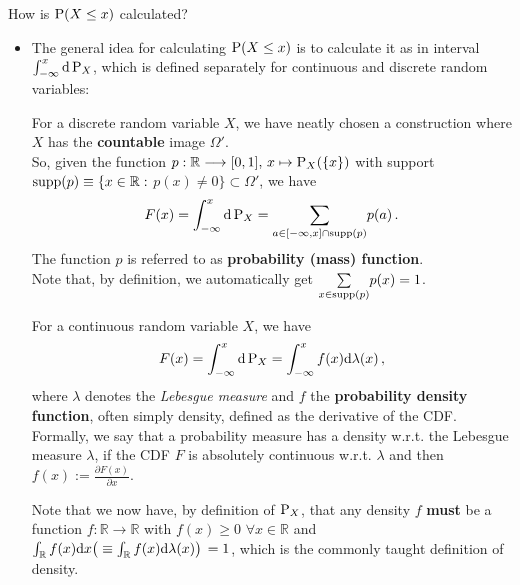 \documentclass[a4,11pt]{beamer}
\newcommand{\R}{\mathbb{R}}
\newlength{\wideitemsep}
\let\olditem\item
\renewcommand{\item}{\setlength{\itemsep}{\wideitemsep}\olditem}
\begin{document}
\begin{frame}[allowframebreaks]{How is $\operatorname{P}(X\leq x)$ calculated?}
\vspace{-.4cm}
    \begin{itemize}
        \item The general idea for calculating $\operatorname{P}(X\leq x)$ is to calculate it as in interval $\int_{-\infty}^x\mathrm{d}\operatorname{P}_X$, which is defined separately for continuous and discrete random variables:
        \begin{definition}
          For a \textcolor{blueberry}{discrete random variable} $X$, we have neatly chosen a construction where $X$ has the \textbf{countable} image $\Omega'$. \\So, given the function $p:\R\longrightarrow[0,1],\, x\mapsto \pr_X(\{x\})$ with support $\supp(p)\equiv\{x\in\R:$ $p(x)\neq0\}\subset\Omega'$, we have $$
            F(x)=\int_{-\infty}^x\mathrm{d}\operatorname{P}_X=\underset{a\in [-\infty,x]\cap\operatorname{supp}(p)}{\sum}p(a)\,.$$
            The function $p$ is referred to as \textbf{probability (mass) function}. \\Note that, by definition, we automatically get $\underset{x\in\operatorname{supp}(p)}{\sum}p(x)=1$.
        \end{definition}

        \begin{definition}
          For a \textcolor{blueberry}{continuous random variable} $X$, we have$$
            F(x)=\int_{-\infty}^x\mathrm{d}\operatorname{P}_X=\int_{-\infty}^x f(x)\mathrm{d}\lambda(x)\,,
            $$ where $\lambda$ denotes the \emph{Lebesgue measure} and $f$ the \textbf{probability density function}, often simply density, defined as the derivative of the CDF.\smallskip\\
            Formally, we say that a probability measure has a density w.r.t. the Lebesgue measure $\lambda$, if the CDF $F$ is absolutely continuous w.r.t. $\lambda$ and then $f(x):=\frac{\partial F(x)}{\partial x}$.
        \end{definition}
{\tiny Note that we now have, by definition of $\operatorname{P}_X$, that any density $f$ \textbf{must} be a function $f:\R\longrightarrow\R$ with $f(x)\geq 0\,\,\forall x\in\R$ and $\int_\R f(x)\diff x\big(\equiv\int_\R f(x)\diff \lambda (x)\big)\,=1$, which is the commonly taught definition of density.}

    \end{itemize}
\end{frame}
\end{document}
